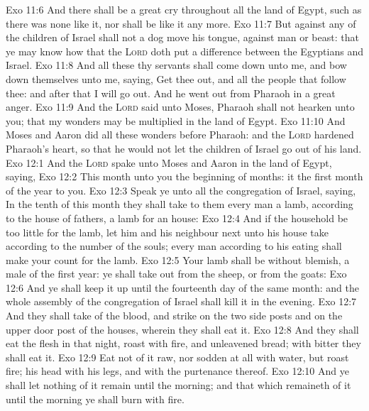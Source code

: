 \vs Exo 11:6 And there shall be a great cry throughout all the land of Egypt, such as there was none like it, nor shall be like it any more.
\vs Exo 11:7 But against any of the children of Israel shall not a dog move his tongue, against man or beast: that ye may know how that the \textsc{Lord} doth put a difference between the Egyptians and Israel.
\vs Exo 11:8 And all these thy servants shall come down unto me, and bow down themselves unto me, saying, Get thee out, and all the people that follow thee: and after that I will go out. And he went out from Pharaoh in a great anger.
\vs Exo 11:9 And the \textsc{Lord} said unto Moses, Pharaoh shall not hearken unto you; that my wonders may be multiplied in the land of Egypt.
\vs Exo 11:10 And Moses and Aaron did all these wonders before Pharaoh: and the \textsc{Lord} hardened Pharaoh's heart, so that he would not let the children of Israel go out of his land.
\vs Exo 12:1 And the \textsc{Lord} spake unto Moses and Aaron in the land of Egypt, saying,
\vs Exo 12:2 This month  unto you the beginning of months: it  the first month of the year to you.
\vs Exo 12:3 Speak ye unto all the congregation of Israel, saying, In the tenth  of this month they shall take to them every man a lamb, according to the house of  fathers, a lamb for an house:
\vs Exo 12:4 And if the household be too little for the lamb, let him and his neighbour next unto his house take  according to the number of the souls; every man according to his eating shall make your count for the lamb.
\vs Exo 12:5 Your lamb shall be without blemish, a male of the first year: ye shall take  out from the sheep, or from the goats:
\vs Exo 12:6 And ye shall keep it up until the fourteenth day of the same month: and the whole assembly of the congregation of Israel shall kill it in the evening.
\vs Exo 12:7 And they shall take of the blood, and strike  on the two side posts and on the upper door post of the houses, wherein they shall eat it.
\vs Exo 12:8 And they shall eat the flesh in that night, roast with fire, and unleavened bread;  with bitter  they shall eat it.
\vs Exo 12:9 Eat not of it raw, nor sodden at all with water, but roast  fire; his head with his legs, and with the purtenance thereof.
\vs Exo 12:10 And ye shall let nothing of it remain until the morning; and that which remaineth of it until the morning ye shall burn with fire.

